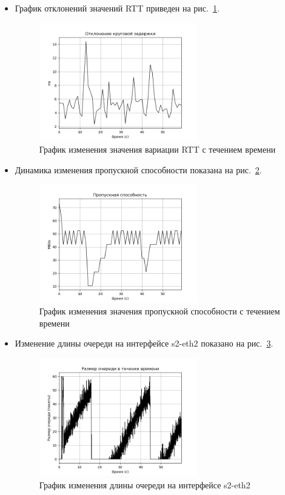 \begin{itemize}
\item График отклонений значений RTT приведен на рис.~\ref{fig:30008}.

\begin{figure}[H]
\centering
\includegraphics[width=0.65\textwidth]{image/ch03_01/rttvar.png}
\caption{График изменения значения вариации RTT с течением времени}
\label{fig:30008}
\end{figure}

\item Динамика изменения пропускной способности показана на
  рис.~\ref{fig:30009}.

  \begin{figure}[H]
\centering
\includegraphics[width=0.65\textwidth]{image/ch03_01/throughput.png}
\caption{График изменения значения пропускной способности с течением
  времени}
\label{fig:30009}
\end{figure}

\item Изменение длины очереди на интерфейсе s2-eth2 показано на
  рис.~\ref{fig:30010}.

\begin{figure}[H]
\centering
\includegraphics[width=0.65\textwidth]{image/ch03_01/queue_len.png}
\caption{График изменения длины очереди на интерфейсе
  s2-eth2}
\label{fig:30010}
\end{figure}


\end{itemize}
